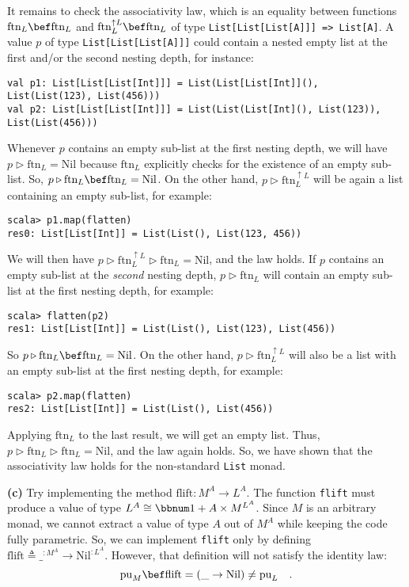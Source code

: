 It remains to check the associativity law, which is an equality between
functions $\text{ftn}_{L}\bef\text{ftn}_{L}$ and $\text{ftn}_{L}^{\uparrow L}\bef\text{ftn}_{L}$
of type \lstinline!List[List[List[A]]] => List[A]!. A value $p$
of type \lstinline!List[List[List[A]]]! could contain a nested empty
list at the first and/or the second nesting depth, for instance:
\begin{lstlisting}
val p1: List[List[List[Int]]] = List(List[List[Int]](), List(List(123), List(456)))
val p2: List[List[List[Int]]] = List(List(List[Int](), List(123)), List(List(456)))
\end{lstlisting}
Whenever $p$ contains an empty sub-list at the first nesting depth,
we will have $p\triangleright\text{ftn}_{L}=\text{Nil}$ because $\text{ftn}_{L}$
explicitly checks for the existence of an empty sub-list. So, $p\triangleright\text{ftn}_{L}\bef\text{ftn}_{L}=\text{Nil}$.
On the other hand, $p\triangleright\text{ftn}_{L}^{\uparrow L}$ will
be again a list containing an empty sub-list, for example:
\begin{lstlisting}
scala> p1.map(flatten)
res0: List[List[Int]] = List(List(), List(123, 456))
\end{lstlisting}
We will then have $p\triangleright\text{ftn}_{L}^{\uparrow L}\triangleright\text{ftn}_{L}=\text{Nil}$,
and the law holds. If $p$ contains an empty sub-list at the \emph{second}
nesting depth, $p\triangleright\text{ftn}_{L}$ will contain an empty
sub-list at the first nesting depth, for example:
\begin{lstlisting}
scala> flatten(p2)
res1: List[List[Int]] = List(List(), List(123), List(456)) 
\end{lstlisting}
So $p\triangleright\text{ftn}_{L}\bef\text{ftn}_{L}=\text{Nil}$.
On the other hand, $p\triangleright\text{ftn}_{L}^{\uparrow L}$ will
also be a list with an empty sub-list at the first nesting depth,
for example:
\begin{lstlisting}
scala> p2.map(flatten)
res2: List[List[Int]] = List(List(), List(456))
\end{lstlisting}
Applying $\text{ftn}_{L}$ to the last result, we will get an empty
list. Thus, $p\triangleright\text{ftn}_{L}\triangleright\text{ftn}_{L}=\text{Nil}$,
and the law again holds. So, we have shown that the associativity
law holds for the non-standard \lstinline!List! monad.

\textbf{(c)} Try implementing the method $\text{flift}:M^{A}\rightarrow L^{A}$.
The function \lstinline!flift! must produce a value of type $L^{A}\cong\bbnum 1+A\times M^{L^{A}}$.
Since $M$ is an arbitrary monad, we cannot extract a value of type
$A$ out of $M^{A}$ while keeping the code fully parametric. So,
we can implement \lstinline!flift! only by defining $\text{flift}\triangleq\_^{:M^{A}}\rightarrow\text{Nil}^{:L^{A}}$.
However, that definition will not satisfy the identity law:
\[
\text{pu}_{M}\bef\text{flift}=(\_\rightarrow\text{Nil})\neq\text{pu}_{L}\quad.
\]


